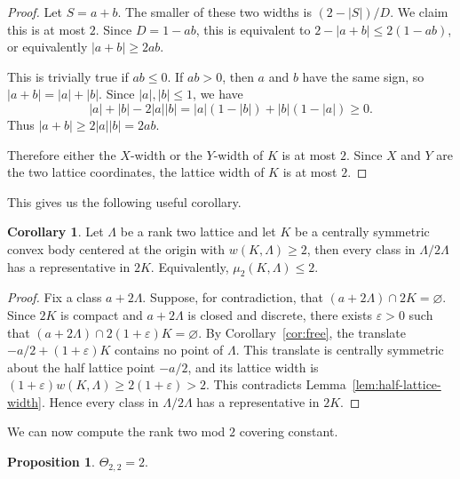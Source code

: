 \documentclass[11pt,reqno]{amsart}
\numberwithin{equation}{section}
\numberwithin{equation}{section}
\theoremstyle{definition}
\newtheorem{proposition}[theorem]{Proposition}
\newtheorem{corollary}[theorem]{Corollary}
\begin{document}
\begin{proof}
Let \(S=a+b\). The smaller of these two widths is \((2-|S|)/D\). We claim this is at most \(2\). Since \(D=1-ab\), this is equivalent to \(2-|a+b|\le2(1-ab)\), or equivalently \(|a+b|\ge2ab\).

This is trivially true if \(ab\le0\). If \(ab>0\), then \(a\) and \(b\) have the same sign, so \(|a+b|=|a|+|b|\). Since \(|a|,|b|\le1\), we have
\[
|a|+|b|-2|a||b|
=
|a|(1-|b|)+|b|(1-|a|)
\ge0.
\]
Thus \(|a+b|\ge2|a||b|=2ab\).

Therefore either the \(X\)-width or the \(Y\)-width of \(K\) is at most \(2\). Since \(X\) and \(Y\) are the two lattice coordinates, the lattice width of \(K\) is at most \(2\).
\end{proof}

This gives us the following useful corollary.

\begin{corollary}\label{cor:width-two-mod-two-covering}
Let \(\Lambda\) be a rank two lattice and let \(K\) be a centrally symmetric convex body centered at the origin with \(w(K,\Lambda)\ge2\), then every class in \(\Lambda/2\Lambda\) has a representative in \(2K\). Equivalently, \(\mu_2(K,\Lambda)\le2\).
\end{corollary}

\begin{proof}
Fix a class \(a+2\Lambda\). Suppose, for contradiction, that \((a+2\Lambda)\cap2K=\varnothing\). Since \(2K\) is compact and \(a+2\Lambda\) is closed and discrete, there exists \(\varepsilon>0\) such that \((a+2\Lambda)\cap2(1+\varepsilon)K=\varnothing\). By Corollary~\ref{cor:free}, the translate \(-a/2+(1+\varepsilon)K\) contains no point of \(\Lambda\). This translate is centrally symmetric about the half lattice point \(-a/2\), and its lattice width is \((1+\varepsilon)w(K,\Lambda)\ge2(1+\varepsilon)>2\). This contradicts Lemma~\ref{lem:half-lattice-width}. Hence every class in \(\Lambda/2\Lambda\) has a representative in \(2K\).
\end{proof}

We can now compute the rank two mod \(2\) covering constant.

\begin{proposition}\label{prop:theta-22}
\(\Theta_{2,2}=2\).
\end{proposition}
\end{document}
